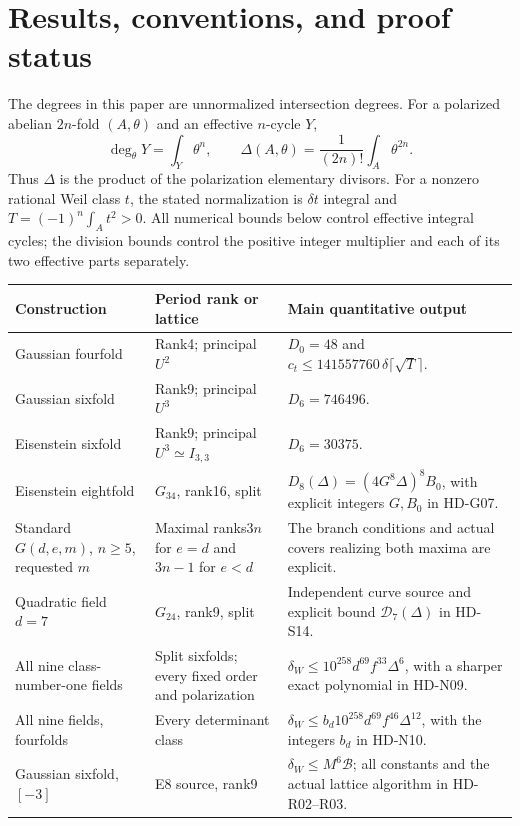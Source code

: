 \section*{Results, conventions, and proof status}

The degrees in this paper are unnormalized intersection degrees. For a
polarized abelian $2n$-fold $(A,\theta)$ and an effective $n$-cycle $Y$,
\[
 \deg_\theta Y=\int_Y\theta^n,\qquad
 \Delta(A,\theta)=\frac{1}{(2n)!}\int_A\theta^{2n}.
\]
Thus $\Delta$ is the product of the polarization elementary divisors.
For a nonzero rational Weil class $t$, the stated normalization is
$\delta t$ integral and $T=(-1)^n\int_A t^2>0$.
All numerical bounds below control effective integral cycles; the
division bounds control the positive integer multiplier and each
of its two effective parts separately.

\begin{center}
\begin{tabular}{p{}p{}p{}}
\toprule
Construction & Period rank or lattice & Main quantitative output\\
\midrule
Gaussian fourfold & Rank4; principal $U^2$ & $D_0=48$ and
$c_t\le141557760\,\delta\lceil\sqrt T\rceil$.\\[3pt]
Gaussian sixfold & Rank9; principal $U^3$ & $D_6=746496$.\\[3pt]
Eisenstein sixfold & Rank9; principal $U^3\simeq I_{3,3}$ &
$D_6=30375$.\\[3pt]
Eisenstein eightfold & $G_{34}$, rank16, split &
$D_8(\Delta)=(4G^8\Delta)^8B_0$, with explicit integers $G,B_0$ in HD-G07.\\[3pt]
Standard $G(d,e,m)$,
$n\ge5$, requested $m$ & Maximal ranks$3n$ for $e=d$ and$3n-1$ for $e<d$ &
The branch conditions and actual covers realizing both maxima are explicit.\\[3pt]
Quadratic field $d=7$ & $G_{24}$, rank9, split &
Independent curve source and explicit bound $\mathcal D_7(\Delta)$ in HD-S14.\\[3pt]
All nine class-number-one fields & Split sixfolds; every fixed order and polarization &
$\delta_W\le10^{258}d^{69}f^{33}\Delta^6$, with a sharper exact polynomial in HD-N09.\\[3pt]
All nine fields, fourfolds & Every determinant class &
$\delta_W\le b_d10^{258}d^{69}f^{46}\Delta^{12}$, with the integers $b_d$ in HD-N10.\\[3pt]
Gaussian sixfold, $[-3]$ & E8 source, rank9 & $\delta_W\le M^6\mathcal B$; all constants and the actual lattice algorithm in HD-R02--R03.\\
\bottomrule
\end{tabular}
\end{center}

